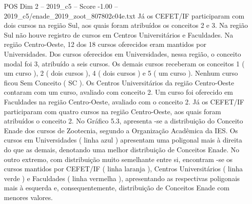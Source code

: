 \begin{textsample}{POS Dim 2 – 2019\_c5 – Score -1.00 – 2019\_c5/enade\_2019\_zoot\_807802c04e.txt}
Já os CEFET/IF participaram com dois cursos na região Sul, aos quais foram atribuídos os conceitos 2 e 3.
Na região Sul não houve registro de cursos em Centros Universitários e Faculdades.
Na região Centro-Oeste, 12 dos 18 cursos oferecidos eram mantidos por Universidades.
Dos cursos oferecidos em Universidades, nessa região, o conceito modal foi 3, atribuído a seis cursos.
Os demais cursos receberam os conceitos 1 ( um curso ), 2 ( dois cursos ), 4 ( dois cursos ) e 5 ( um curso ).
Nenhum curso ficou Sem Conceito ( SC ).
Os Centros Universitários da região Centro-Oeste contaram com um curso, avaliado com conceito 2.
Um curso foi oferecido em Faculdades na região Centro-Oeste, avaliado com o conceito 2.
Já os CEFET/IF participaram com quatro cursos na região Centro-Oeste, aos quais foram atribuídos o conceito 2.
No Gráfico 5.3, apresenta -se a distribuição do Conceito Enade dos cursos de Zootecnia, segundo a Organização Acadêmica da IES.
Os cursos em Universidades ( linha azul ) apresentam uma poligonal mais à direita do que as demais, denotando uma melhor distribuição de Conceitos Enade.
No outro extremo, com distribuição muito semelhante entre si, encontram -se os cursos mantidos por CEFET/IF ( linha laranja ), Centros Universitários ( linha verde ) e Faculdades ( linha vermelha ), apresentando as respectivas poligonais mais à esquerda e, consequentemente, distribuição de Conceitos Enade com menores valores.

\end{textsample}

